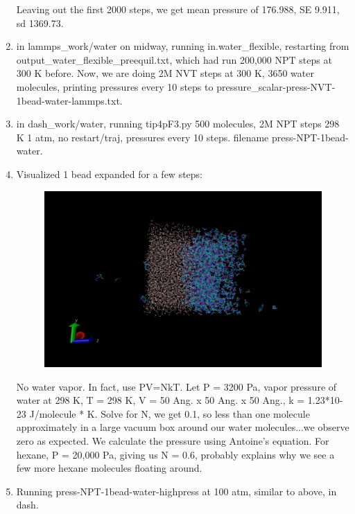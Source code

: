 \documentclass[12pt,reqno]{amsart}
\numberwithin{equation}{section}
\begin{document}
\begin{enumerate}
\begin{figure}[H]
\end{figure}
Leaving out the first 2000 steps, we get mean pressure of 176.988, SE 9.911, sd 1369.73.  
\item in lammps\_work/water on midway, running in.water\_flexible, restarting from output\_water\_flexible\_preequil.txt, which had run 200,000 NPT steps at 300 K before.  Now, we are doing 2M NVT steps at 300 K, 3650 water molecules, printing pressures every 10 steps to pressure\_scalar-press-NVT-1bead-water-lammps.txt.  
\item in dash\_work/water, running tip4pF3.py 500 molecules, 2M NPT steps 298 K 1 atm, no restart/traj, pressures every 10 steps.  filename press-NPT-1bead-water.  
\item Visualized 1 bead expanded for a few steps: 
\begin{figure}[H]
\centering
\includegraphics[scale=0.6]{visualize}
\end{figure}
No water vapor.  In fact, use PV=NkT.  Let P = 3200 Pa, vapor pressure of water at 298 K, T = 298 K, V = 50 Ang. x 50 Ang. x 50 Ang., k = 1.23*10-23 J/molecule * K.  Solve for N, we get 0.1, so less than one molecule approximately in a large vacuum box around our water molecules...we observe zero as expected.  We calculate the pressure using Antoine's equation.  For hexane, P = 20,000 Pa, giving us N = 0.6,  probably explains why we see a few more hexane molecules floating around.  
\item Running press-NPT-1bead-water-highpress at 100 atm, similar to above, in dash.  
\end{enumerate}
\end{document}
